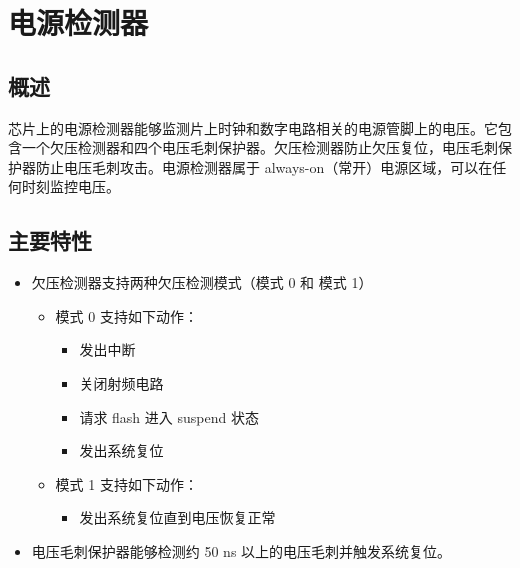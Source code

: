 \documentclass[main\_\_CN.tex]{subfiles}
\begin{document}

\ifglobal
\else
    \listoftodos
    {\let\clearpage\relax \listofdonetodos}
    \tableofcontents
\fi




\hypertarget{psdet}{}
\chapter{电源检测器}
\label{mod:psdet}

\section{概述}

\chipname{} 芯片上的电源检测器能够监测片上时钟和数字电路相关的电源管脚上的电压。它包含一个欠压检测器和四个电压毛刺保护器。欠压检测器防止欠压复位，电压毛刺保护器防止电压毛刺攻击。电源检测器属于 always-on（常开）电源区域，可以在任何时刻监控电压。



\section{主要特性}
\label{sec:alias-features}

\begin{itemize}
    \item 欠压检测器支持两种欠压检测模式（模式 0 和 模式 1）
    \begin{itemize}
    \item 模式 0 支持如下动作：
        \begin{itemize}
        \item 发出中断
        \item 关闭射频电路
        \item 请求 flash 进入 suspend 状态
        \item 发出系统复位
        \end{itemize}
    \item 模式 1 支持如下动作：
        \begin{itemize}
        \item 发出系统复位直到电压恢复正常
        \end{itemize}
    \end{itemize}
    \item 电压毛刺保护器能够检测约 50 ns 以上的电压毛刺并触发系统复位。
\end{itemize}
\end{document}
